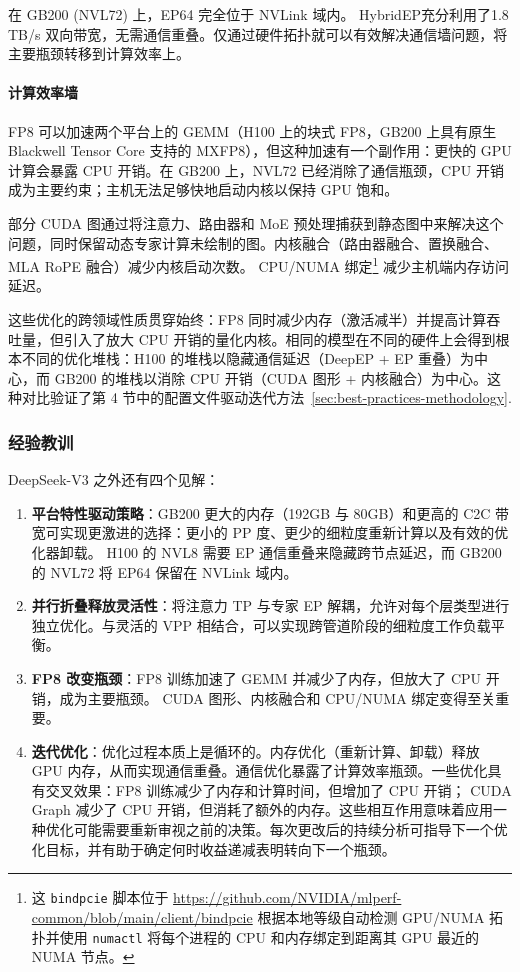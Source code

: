 \documentclass[10pt,logo,copyright]{nvidiatechreport_zh}
\begin{document}
在 GB200 (NVL72) 上，EP64 完全位于 NVLink 域内。 HybridEP充分利用了1.8\,TB/s 双向带宽，无需通信重叠。仅通过硬件拓扑就可以有效解决通信墙问题，将主要瓶颈转移到计算效率上。

\paragraph*{计算效率墙}
FP8 可以加速两个平台上的 GEMM（H100 上的块式 FP8，GB200 上具有原生 Blackwell Tensor Core 支持的 MXFP8），但这种加速有一个副作用：更快的 GPU 计算会暴露 CPU 开销。在 GB200 上，NVL72 已经消除了通信瓶颈，CPU 开销成为主要约束；主机无法足够快地启动内核以保持 GPU 饱和。

部分 CUDA 图通过将注意力、路由器和 MoE 预处理捕获到静态图中来解决这个问题，同时保留动态专家计算未绘制的图。内核融合（路由器融合、置换融合、MLA RoPE 融合）减少内核启动次数。 CPU/NUMA 绑定\footnote{这 \texttt{bindpcie} 脚本位于 \url{https://github.com/NVIDIA/mlperf-common/blob/main/client/bindpcie} 根据本地等级自动检测 GPU/NUMA 拓扑并使用 \texttt{numactl} 将每个进程的 CPU 和内存绑定到距离其 GPU 最近的 NUMA 节点。} 减少主机端内存访问延迟。

\medskip

这些优化的跨领域性质贯穿始终：FP8 同时减少内存（激活减半）并提高计算吞吐量，但引入了放大 CPU 开销的量化内核。相同的模型在不同的硬件上会得到根本不同的优化堆栈：H100 的堆栈以隐藏通信延迟（DeepEP + EP 重叠）为中心，而 GB200 的堆栈以消除 CPU 开销（CUDA 图形 + 内核融合）为中心。这种对比验证了第 4 节中的配置文件驱动迭代方法~\ref{sec:best-practices-methodology}.

\subsubsection{经验教训}

DeepSeek-V3 之外还有四个见解：

\begin{enumerate}
    \item \textbf{平台特性驱动策略}：GB200 更大的内存（192GB 与 80GB）和更高的 C2C 带宽可实现更激进的选择：更小的 PP 度、更少的细粒度重新计算以及有效的优化器卸载。 H100 的 NVL8 需要 EP 通信重叠来隐藏跨节点延迟，而 GB200 的 NVL72 将 EP64 保留在 NVLink 域内。
    \item \textbf{并行折叠释放灵活性}：将注意力 TP 与专家 EP 解耦，允许对每个层类型进行独立优化。与灵活的 VPP 相结合，可以实现跨管道阶段的细粒度工作负载平衡。
    \item \textbf{FP8 改变瓶颈}：FP8 训练加速了 GEMM 并减少了内存，但放大了 CPU 开销，成为主要瓶颈。 CUDA 图形、内核融合和 CPU/NUMA 绑定变得至关重要。
    \item \textbf{迭代优化}：优化过程本质上是循环的。内存优化（重新计算、卸载）释放 GPU 内存，从而实现通信重叠。通信优化暴露了计算效率瓶颈。一些优化具有交叉效果：FP8 训练减少了内存和计算时间，但增加了 CPU 开销； CUDA Graph 减少了 CPU 开销，但消耗了额外的内存。这些相互作用意味着应用一种优化可能需要重新审视之前的决策。每次更改后的持续分析可指导下一个优化目标，并有助于确定何时收益递减表明转向下一个瓶颈。
\end{enumerate}
\end{document}
